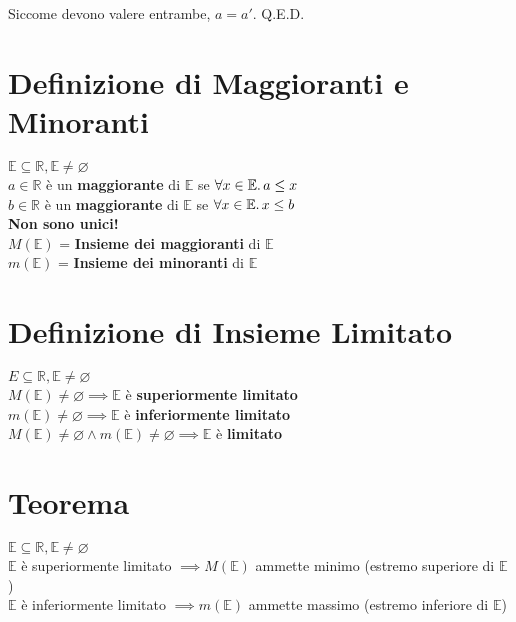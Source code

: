 \documentclass[a4paper, twoside, italian, 11pt]{book}
\newcommand{\R}{\mathbb{R}}
\newcommand{\E}{\mathbb{E}}
\let\emptyset\varnothing
\begin{document}
\noindent
Siccome devono valere entrambe, $a = a'$. Q.E.D.



\section{Definizione di Maggioranti e Minoranti}

\noindent
$\E \subseteq \R, \E \neq \emptyset$ \\

$a \in \R$ è un \textbf{maggiorante} di $\E$ se $\forall x \in \E \ldotp a \leq x$ \\

$b \in \R$ è un \textbf{maggiorante} di $\E$ se $\forall x \in \E \ldotp x \leq b$ \\

\noindent
\textbf{Non sono unici!} \\

\noindent
$M(\E)$ = \textbf{Insieme dei maggioranti} di $\E$\\
$m(\E)$ = \textbf{Insieme dei minoranti} di $\E$



\section{Definizione di Insieme Limitato}

\noindent
$E \subseteq \R, \E \neq \emptyset$ \\

$M(\E) \neq \emptyset \implies \E$ è \textbf{superiormente limitato} \\
\indent
$m(\E) \neq \emptyset \implies \E$ è \textbf{inferiormente limitato} \\
\indent
$M(\E) \neq \emptyset \land m(\E) \neq \emptyset \implies \E$ è \textbf{limitato}



\section{Teorema}

\noindent
$\E \subseteq \R, \E \neq \emptyset$ \\

\noindent
$\E$ è superiormente limitato $\implies M(\E)$ ammette minimo (estremo superiore di $\E$) \\

\noindent
$\E$ è inferiormente limitato $\implies m(\E)$ ammette massimo (estremo inferiore di $\E$)
\end{document}
